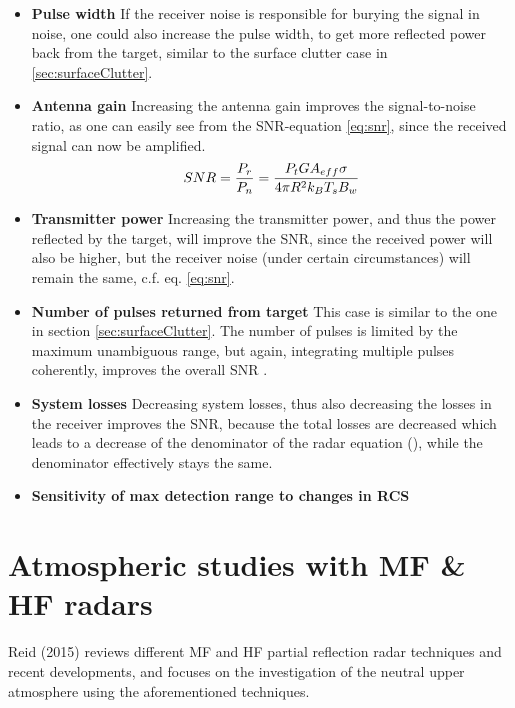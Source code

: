 \begin{itemize}
	\item \textbf{Pulse width}\newline
		If the receiver noise is responsible for burying the signal in noise, one could also increase the pulse width, to get more reflected power back from the target, similar to the surface clutter case in \ref{sec:surfaceClutter}.
	\item \textbf{Antenna gain} \newline
				Increasing the antenna gain improves the signal-to-noise ratio, as one can easily see from the SNR-equation \ref{eq:snr}, since the received signal can now be amplified.
		\begin{equation}
			\label{eq:snr}
			\centering
			SNR = \frac{P_r}{P_n} = \frac{P_t G A_{eff} \sigma}{4 \pi R^2 k_B T_s B_w}
		\end{equation}
	\item \textbf{Transmitter power}\newline
		Increasing the transmitter power, and thus the power reflected by the target, will improve the SNR, since the received power will also be higher, but the receiver noise (under certain circumstances) will remain the same, c.f. eq. \ref{eq:snr}.
	\item \textbf{Number of pulses returned from target}\newline
		This case is similar to the one in section \ref{sec:surfaceClutter}. The number of pulses is limited by the maximum unambiguous range, but again, integrating multiple pulses coherently, improves the overall SNR \citep{richards2010principles}.
	\item \textbf{System losses}\newline
		Decreasing system losses, thus also decreasing the losses in the receiver improves the SNR, because the total losses are decreased which leads to a decrease of the denominator of the radar equation (\citep[c.f.][Eq. 2.17]{richards2010principles}), while the denominator effectively stays the same.
	\item \textbf{Sensitivity of max detection range to changes in RCS}
\end{itemize}

\section{Atmospheric studies with MF \& HF radars}
Reid (2015) \citep{reid2015mf} reviews different MF and HF partial reflection radar techniques and recent developments, and focuses on the investigation of the neutral upper atmosphere using the aforementioned techniques.


